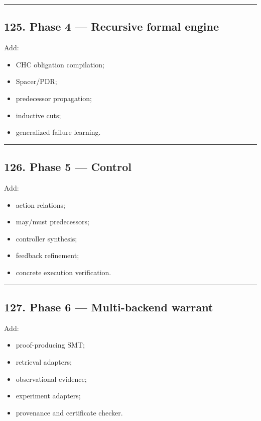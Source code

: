\documentclass[
]{article}
\providecommand{\tightlist}{%
  \setlength{\itemsep}{0pt}\setlength{\parskip}{0pt}}
\begin{document}
\begin{center}\rule{0.5\linewidth}{0.5pt}\end{center}

\subsection{125. Phase 4 --- Recursive formal
engine}\label{phase-4-recursive-formal-engine}

Add:

\begin{itemize}
\tightlist
\item
  CHC obligation compilation;
\item
  Spacer/PDR;
\item
  predecessor propagation;
\item
  inductive cuts;
\item
  generalized failure learning.
\end{itemize}

\begin{center}\rule{0.5\linewidth}{0.5pt}\end{center}

\subsection{126. Phase 5 --- Control}\label{phase-5-control}

Add:

\begin{itemize}
\tightlist
\item
  action relations;
\item
  may/must predecessors;
\item
  controller synthesis;
\item
  feedback refinement;
\item
  concrete execution verification.
\end{itemize}

\begin{center}\rule{0.5\linewidth}{0.5pt}\end{center}

\subsection{127. Phase 6 --- Multi-backend
warrant}\label{phase-6-multi-backend-warrant}

Add:

\begin{itemize}
\tightlist
\item
  proof-producing SMT;
\item
  retrieval adapters;
\item
  observational evidence;
\item
  experiment adapters;
\item
  provenance and certificate checker.
\end{itemize}
\end{document}
